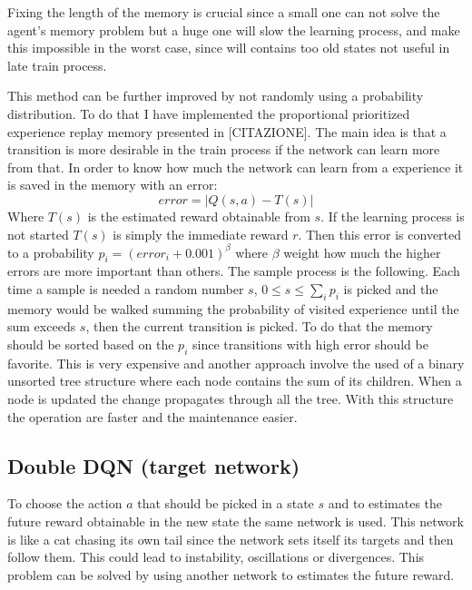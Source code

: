 \documentclass[10pt]{article}
\begin{document}
\begin{multicols}{2}
Fixing the length of the memory is crucial since a small one can not solve the agent's memory problem but a huge one will slow the learning process, and make this impossible in the worst case, since will contains too old states not useful in late train process.

This method can be further improved by not randomly using a probability distribution. To do that I have implemented the proportional prioritized experience replay memory presented in [CITAZIONE]. The main idea is that a transition is more desirable in the train process if the network can learn more from that. In order to know how much the network can learn from a experience it is saved in the memory with an error:
\[
error = |Q(s,a) - T(s)|
\]
Where $T(s)$ is the estimated reward obtainable from $s$. If the learning process is not started $T(s)$ is simply the immediate reward $r$. Then this error is converted to a probability $p_i= (error_i+0.001)^\beta$ where $\beta$ weight how much the higher errors are more important than others.
The sample process is the following. Each time a sample is needed a random number $s$, $0\le s \le \sum_i p_i$ is picked and the memory would be walked summing the probability of visited experience until the sum exceeds $s$, then the current transition is picked. To do that the memory should be sorted based on the $p_i$ since transitions with high error should be favorite. This is very expensive and another approach involve the used of a binary unsorted tree structure where each node contains the sum of its children. When a node is updated the change propagates through all the tree. With this structure the operation are faster and the maintenance easier. 

\subsection{Double DQN (target network)}
To choose the action $a$ that should be picked in a state $s$ and to estimates the future reward obtainable in the new state the same network is used. This network is like a cat chasing its own tail since the network sets itself its targets and then follow them. This could lead to instability, oscillations or divergences. This problem can be solved by using another network to estimates the future reward. 


\end{multicols}
\end{document}
